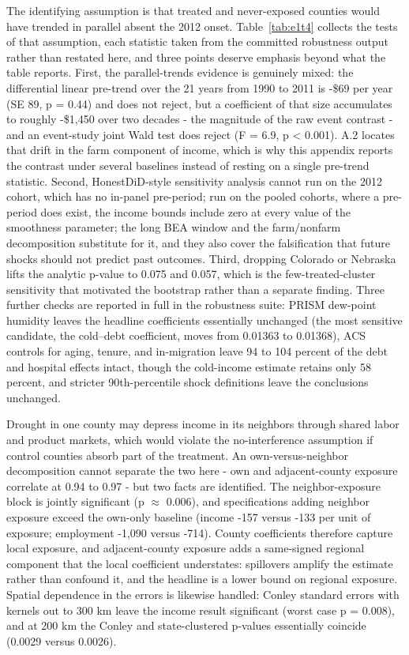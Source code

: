 \documentclass[a4paper,11pt]{report}
\begin{document}
The identifying assumption is that treated and never-exposed counties would have trended in parallel absent the 2012 onset. Table~\ref{tab:e1t4} collects the tests of that assumption, each statistic taken from the committed robustness output rather than restated here, and three points deserve emphasis beyond what the table reports. First, the parallel-trends evidence is genuinely mixed: the differential linear pre-trend over the 21 years from 1990 to 2011 is -\$69 per year (SE 89, p = 0.44) and does not reject, but a coefficient of that size accumulates to roughly -\$1,450 over two decades - the magnitude of the raw event contrast - and an event-study joint Wald test does reject (F = 6.9, p < 0.001). A.2 locates that drift in the farm component of income, which is why this appendix reports the contrast under several baselines instead of resting on a single pre-trend statistic. Second, HonestDiD-style sensitivity analysis \citep{rambachan2023honestdid} cannot run on the 2012 cohort, which has no in-panel pre-period; run on the pooled cohorts, where a pre-period does exist, the income bounds include zero at every value of the smoothness parameter; the long BEA window and the farm/nonfarm decomposition substitute for it, and they also cover the falsification that future shocks should not predict past outcomes. Third, dropping Colorado or Nebraska lifts the analytic p-value to 0.075 and 0.057, which is the few-treated-cluster sensitivity that motivated the bootstrap rather than a separate finding. Three further checks are reported in full in the robustness suite: PRISM dew-point humidity leaves the headline coefficients essentially unchanged (the most sensitive candidate, the cold--debt coefficient, moves from 0.01363 to 0.01368), ACS controls for aging, tenure, and in-migration leave 94 to 104 percent of the debt and hospital effects intact, though the cold-income estimate retains only 58 percent, and stricter 90th-percentile shock definitions leave the conclusions unchanged.



Drought in one county may depress income in its neighbors through shared labor and product markets, which would violate the no-interference assumption if control counties absorb part of the treatment. An own-versus-neighbor decomposition cannot separate the two here - own and adjacent-county exposure correlate at 0.94 to 0.97 - but two facts are identified. The neighbor-exposure block is jointly significant (p $\approx$ 0.006), and specifications adding neighbor exposure exceed the own-only baseline (income -157 versus -133 per unit of exposure; employment -1,090 versus -714). County coefficients therefore capture local exposure, and adjacent-county exposure adds a same-signed regional component that the local coefficient understates: spillovers amplify the estimate rather than confound it, and the headline is a lower bound on regional exposure. Spatial dependence in the errors is likewise handled: Conley standard errors with kernels out to 300 km leave the income result significant (worst case p = 0.008), and at 200 km the Conley and state-clustered p-values essentially coincide (0.0029 versus 0.0026).
\end{document}

